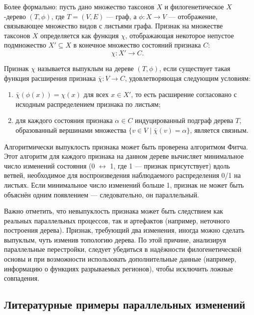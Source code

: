 Более формально: пусть дано множество таксонов $X$ и филогенетическое $X$-дерево $(T, \phi)$, где $T = (V,E)$ — граф, а $\phi: X \rightarrow V$ — отображение, связывающее множество видов с листьями графа.
Признак на множестве таксонов $X$ определяется как функция $\chi$, отображающая некоторое непустое подмножество $X' \subseteq X$ в конечное множество состояний признака $C$:
\[
\chi: X' \rightarrow C.
\]

Признак $\chi$ называется выпуклым на дереве $(T,\phi)$, если существует такая функция расширения признака $\bar{\chi}: V \rightarrow C$, удовлетворяющая следующим условиям:

\begin{enumerate}
    \item $\bar{\chi}(\phi(x)) = \chi(x)$ для всех $x \in X'$, то есть расширение согласовано с исходным распределением признака по листьям;
    \item для каждого состояния признака $\alpha \in C$ индуцированный подграф дерева $T$, образованный вершинами множества $\{ v \in V \mid \bar{\chi}(v) = \alpha \}$, является связным.
\end{enumerate}

Алгоритмически выпуклость признака может быть проверена алгоритмом Фитча.
Этот алгоритм для каждого признака на данном дереве вычисляет минимальное число изменений состояния (0 $\leftrightarrow$ 1, где 1 — признак присутствует) вдоль ветвей, необходимое для воспроизведения наблюдаемого распределения 0/1 на листьях. 
Если минимальное число изменений больше 1, признак не может быть объяснён одним появлением — следовательно, он параллельный.

Важно отметить, что невыпуклость признака может быть следствием как реальных параллельных процессов, так и артефактов (например, неточного построения дерева).
Признак, требующий два изменения, иногда можно сделать выпуклым, чуть изменив топологию дерева.
По этой причине, анализируя параллельные перестройки, следует убедиться в надёжности филогенетической основы и при возможности использовать дополнительные данные (например, информацию о функциях разрываемых регионов), чтобы исключить ложные совпадения.

\subsection{Литературные примеры параллельных изменений}
\label{subsec:parallel_changes_examples}

